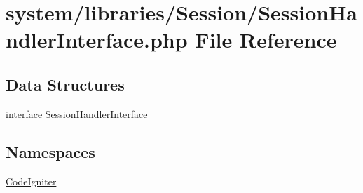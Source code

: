 \hypertarget{_session_handler_interface_8php}{}\section{system/libraries/\+Session/\+Session\+Handler\+Interface.php File Reference}
\label{_session_handler_interface_8php}
\subsection*{Data Structures}
\begin{DoxyCompactItemize}
\item 
interface \mbox{\hyperlink{interface_session_handler_interface}{Session\+Handler\+Interface}}
\end{DoxyCompactItemize}
\subsection*{Namespaces}
\begin{DoxyCompactItemize}
\item 
 \mbox{\hyperlink{namespace_code_igniter}{Code\+Igniter}}
\end{DoxyCompactItemize}
